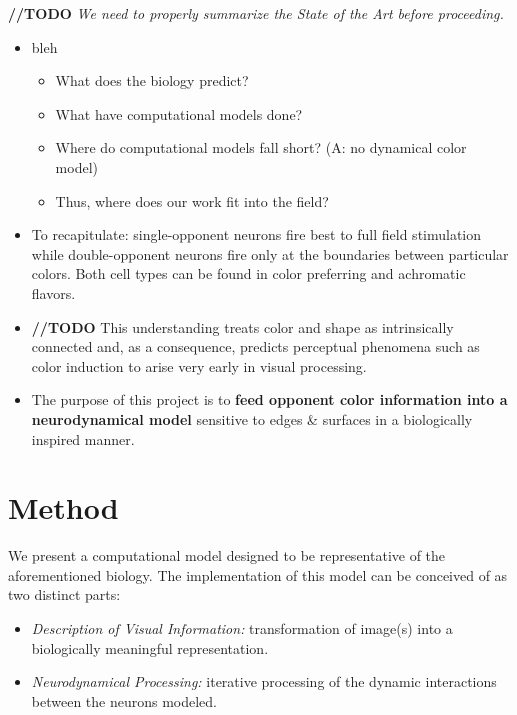 \documentclass[journal,onecolumn]{IEEEtran}
\begin{document}
\textbf{//TODO} \textit{We need to properly summarize the State of the Art before proceeding.}
\begin{itemize}
    \item bleh
    \begin{itemize}
        \item What does the biology predict?
        \item What have computational models done?
        \item Where do computational models fall short? (A: no dynamical color model)
        \item Thus, where does our work fit into the field?
    \end{itemize}
    \item To recapitulate: single-opponent neurons fire best to full field stimulation while double-opponent neurons fire only at the boundaries between particular colors. Both cell types can be found in color preferring and achromatic flavors.
    \item \textbf{//TODO} This understanding treats color and shape as intrinsically connected and, as a consequence, predicts perceptual phenomena such as color induction to arise very early in visual processing.
    \item The purpose of this project is to \textbf{feed opponent color information into a neurodynamical model} sensitive to edges \& surfaces in a biologically inspired manner.
\end{itemize}



%
%
%
\section{Method}

We present a computational model designed to be representative of the aforementioned biology. The implementation of this model can be conceived of as two distinct parts:
\begin{itemize}
    \item \textit{Description of Visual Information:} transformation of image(s) into a biologically meaningful representation.
    \item \textit{Neurodynamical Processing:} iterative processing of the dynamic interactions between the neurons modeled.
\end{itemize}
\end{document}
